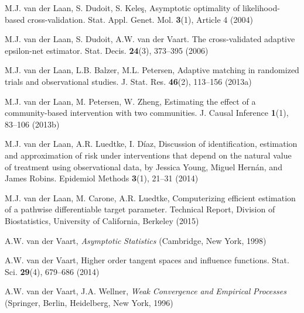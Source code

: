 \begin{list}{}{\setlength{\leftmargin}{2.1em}\setlength{\labelwidth}{0pt}
  \setlength{\labelsep}{0pt}\setlength{\itemindent}{-2.1em}
  \setlength{\parsep}{0pt}\setlength{\itemsep}{2pt}\setlength{\topsep}{0pt}}
\item\label{refentry:REF434}M.J. van der Laan, S. Dudoit, S. Keleş, Asymptotic optimality of likelihood-based cross-validation. Stat. Appl. Genet. Mol. \textbf{3}(1), Article 4 (2004)\label{refend:REF434}
\item\label{refentry:REF435}M.J. van der Laan, S. Dudoit, A.W. van der Vaart. The cross-validated adaptive epsilon-net estimator. Stat. Decis. \textbf{24}(3), 373--395 (2006)\label{refend:REF435}
\item\label{refentry:REF436}M.J. van der Laan, L.B. Balzer, M.L. Petersen, Adaptive matching in randomized trials and observational studies. J. Stat. Res. \textbf{46}(2), 113--156 (2013a)\label{refend:REF436}
\item\label{refentry:REF437}M.J. van der Laan, M. Petersen, W. Zheng, Estimating the effect of a community-based intervention with two communities. J. Causal Inference \textbf{1}(1), 83--106 (2013b)\label{refend:REF437}
\item\label{refentry:REF438}M.J. van der Laan, A.R. Luedtke, I. Díaz, Discussion of identification, estimation and approximation of risk under interventions that depend on the natural value of treatment using observational data, by Jessica Young, Miguel Hernán, and James Robins. Epidemiol Methods \textbf{3}(1), 21--31 (2014)\label{refend:REF438}
\item\label{refentry:REF439}M.J. van der Laan, M. Carone, A.R. Luedtke, Computerizing efficient estimation of a pathwise differentiable target parameter. Technical Report, Division of Biostatistics, University of California, Berkeley (2015)\label{refend:REF439}
\item\label{refentry:REF440}A.W. van der Vaart, \textit{Asymptotic} \textit{Statistics} (Cambridge, New York, 1998)\label{refend:REF440}
\item\label{refentry:REF441}A.W. van der Vaart, Higher order tangent spaces and influence functions. Stat. Sci. \textbf{29}(4), 679--686 (2014)\label{refend:REF441}
\item\label{refentry:REF442}A.W. van der Vaart, J.A. Wellner, \textit{Weak} \textit{Convergence} \textit{and} \textit{Empirical} \textit{Processes} (Springer, Berlin, Heidelberg, New York, 1996)\label{refend:REF442}

\end{list}

